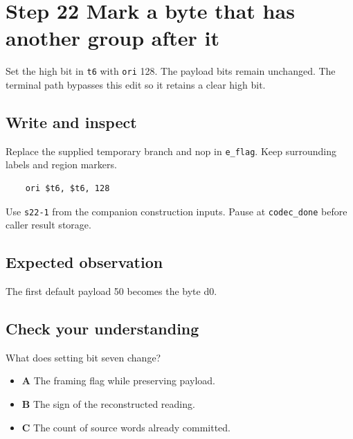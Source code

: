 \section{Step 22 Mark a byte that has another group after it}\label{delta-s22}

Set the high bit in \texttt{t6} with \texttt{ori} 128. The payload bits remain unchanged. The terminal path bypasses this edit so it retains a clear high bit.

\subsection{Write and inspect}
Replace the supplied temporary branch and nop in \texttt{e\_flag}. Keep surrounding labels and region markers.

\begin{verbatim}
    ori $t6, $t6, 128
\end{verbatim}
Use \texttt{s22-1} from the companion construction inputs. Pause at \texttt{codec\_done} before caller result storage.

\subsection{Expected observation}
The first default payload 50 becomes the byte d0.

\subsection{Check your understanding}
What does setting bit seven change?

\begin{itemize}
  \item \textbf{A} The framing flag while preserving payload.
  \item \textbf{B} The sign of the reconstructed reading.
  \item \textbf{C} The count of source words already committed.
\end{itemize}
